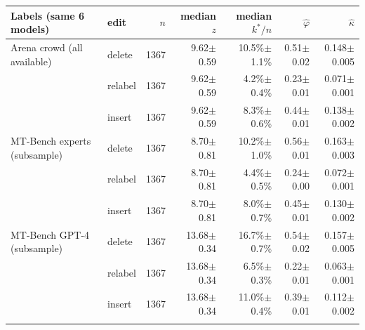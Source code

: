 \begin{tabular}{llrrrrr}\toprule
Labels (same 6 models) & edit & $n$ & median $z$ & median $k^*/n$ & $\hat\varphi$ & $\hat\kappa$ \\\midrule
Arena crowd (all available) & delete & 1367 & 9.62$\pm$0.59 & 10.5\%$\pm$1.1\% & 0.51$\pm$0.02 & 0.148$\pm$0.005 \\
 & relabel & 1367 & 9.62$\pm$0.59 & 4.2\%$\pm$0.4\% & 0.23$\pm$0.01 & 0.071$\pm$0.001 \\
 & insert & 1367 & 9.62$\pm$0.59 & 8.3\%$\pm$0.6\% & 0.44$\pm$0.01 & 0.138$\pm$0.002 \\
\addlinespace
MT-Bench experts (subsample) & delete & 1367 & 8.70$\pm$0.81 & 10.2\%$\pm$1.0\% & 0.56$\pm$0.01 & 0.163$\pm$0.003 \\
 & relabel & 1367 & 8.70$\pm$0.81 & 4.4\%$\pm$0.5\% & 0.24$\pm$0.00 & 0.072$\pm$0.001 \\
 & insert & 1367 & 8.70$\pm$0.81 & 8.0\%$\pm$0.7\% & 0.45$\pm$0.01 & 0.130$\pm$0.002 \\
\addlinespace
MT-Bench GPT-4 (subsample) & delete & 1367 & 13.68$\pm$0.34 & 16.7\%$\pm$0.7\% & 0.54$\pm$0.02 & 0.157$\pm$0.005 \\
 & relabel & 1367 & 13.68$\pm$0.34 & 6.5\%$\pm$0.3\% & 0.22$\pm$0.01 & 0.063$\pm$0.001 \\
 & insert & 1367 & 13.68$\pm$0.34 & 11.0\%$\pm$0.4\% & 0.39$\pm$0.01 & 0.112$\pm$0.002 \\
\addlinespace
\bottomrule\end{tabular}
